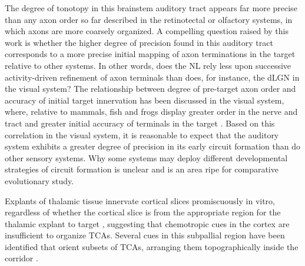 The degree of tonotopy in this brainstem auditory tract appears far more precise than any axon order so far described in the retinotectal or olfactory systems, in which axons are more coarsely organized. 
A compelling question raised by this work is whether the higher degree of precision found in this auditory tract corresponds to a more precise initial mapping of axon terminations in the target relative to other systems. 
In other words, does the NL rely less upon successive activity-driven refinement of axon terminals than does, for instance, the dLGN in the visual system? 
The relationship between degree of pre-target axon order and accuracy of initial target innervation has been discussed in the visual system, where, relative to mammals, fish and frogs display greater order in the nerve and tract and greater initial accuracy of terminals in the target \cite{simon1991relationship}. 
Based on this correlation in the visual system, it is reasonable to expect that the auditory system exhibits a greater degree of precision in its early circuit formation than do other sensory systems. 
Why some systems may deploy different developmental strategies of circuit formation is unclear and is an area ripe for comparative evolutionary study. 


Explants of thalamic tissue innervate cortical slices promiscuously in vitro, regardless of whether the cortical slice is from the appropriate region for the thalamic explant to target \cite{molnar1991lack}, suggesting that chemotropic cues in the cortex are insufficient to organize TCAs. 
Several cues in this subpallial region have been identified that orient subsets of TCAs, arranging them topographically inside the corridor \cite{dufour2003area,powell2008topography,seibt2003neurogenin2}. 
